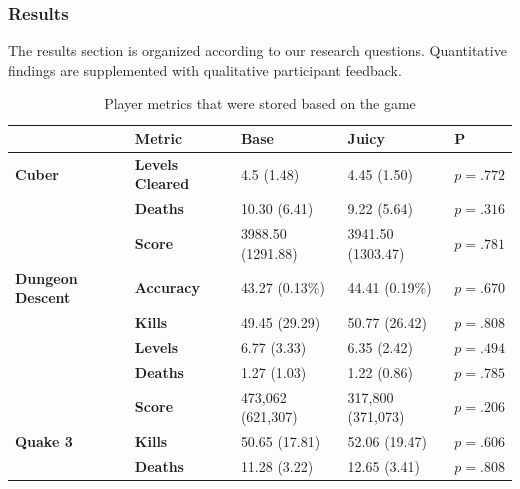 \documentclass{sigchi}
\begin{document}
\subsubsection{Results}
The results section is organized according to our research questions. Quantitative findings are supplemented with qualitative participant feedback.

\begin{scriptsize}
\begin{table}[]
\caption{Player metrics that were stored based on the game}
\label{table:metrics}
\begin{tabular}{p{1.1cm}lp{1.1cm}p{1.1cm}l}
\hline
                         & \textbf{Metric}         & \textbf{Base}     & \textbf{Juicy}    & \textbf{P} \\ \hline
\textbf{Cuber}           & \textbf{Levels Cleared} & 4.5 (1.48)         & 4.45 (1.50)        & $p=.772$                  \\
                         & \textbf{Deaths}         & 10.30 (6.41)       & 9.22 (5.64)        & $p=.316$                  \\
                         & \textbf{Score}          & 3988.50 (1291.88)  & 3941.50 (1303.47)  & $p=.781$                  \\ \hline
\textbf{Dungeon Descent} & \textbf{Accuracy}       & 43.27 (0.13\%) & 44.41 (0.19\%) & $p=.670$                  \\
                         & \textbf{Kills}          & 49.45 (29.29)      & 50.77 (26.42)      & $p=.808$                  \\
                         & \textbf{Levels}         & 6.77 (3.33)        & 6.35 (2.42)        & $p=.494$                  \\
                         & \textbf{Deaths}         & 1.27 (1.03)        & 1.22 (0.86)        & $p=.785$                  \\
                         & \textbf{Score}          & 473,062 (621,307)  & 317,800 (371,073)  & $p=.206$                  \\ \hline
\textbf{Quake 3}         & \textbf{Kills}          & 50.65 (17.81)      & 52.06 (19.47)      & $p=.606$                  \\
                         & \textbf{Deaths}         & 11.28 (3.22)      & 12.65 (3.41)        & $p=.808$  
\end{tabular}
\end{table}
\end{scriptsize}
\end{document}
